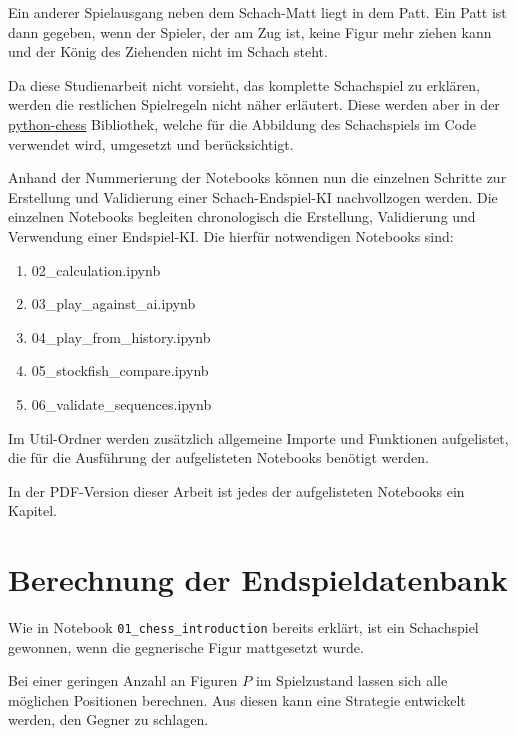 \documentclass[a4paper,12pt]{article}
\providecommand{\tightlist}{%
      \setlength{\itemsep}{0pt}\setlength{\parskip}{0pt}}
\begin{document}
Ein anderer Spielausgang neben dem Schach-Matt liegt in dem Patt. Ein
Patt ist dann gegeben, wenn der Spieler, der am Zug ist, keine Figur
mehr ziehen kann und der König des Ziehenden nicht im Schach steht.

    Da diese Studienarbeit nicht vorsieht, das komplette Schachspiel zu
erklären, werden die restlichen Spielregeln nicht näher erläutert. Diese
werden aber in der
\href{https://python-chess.readthedocs.io/en/latest/}{python-chess}
Bibliothek, welche für die Abbildung des Schachspiels im Code verwendet
wird, umgesetzt und berücksichtigt.

    Anhand der Nummerierung der Notebooks können nun die einzelnen Schritte
zur Erstellung und Validierung einer Schach-Endspiel-KI nachvollzogen
werden. Die einzelnen Notebooks begleiten chronologisch die Erstellung,
Validierung und Verwendung einer Endspiel-KI. Die hierfür notwendigen
Notebooks sind:

\begin{enumerate}
\def\labelenumi{\arabic{enumi}.}
\tightlist
\item
  02\_calculation.ipynb
\item
  03\_play\_against\_ai.ipynb
\item
  04\_play\_from\_history.ipynb
\item
  05\_stockfish\_compare.ipynb
\item
  06\_validate\_sequences.ipynb
\end{enumerate}

Im Util-Ordner werden zusätzlich allgemeine Importe und Funktionen
aufgelistet, die für die Ausführung der aufgelisteten Notebooks benötigt
werden.

In der PDF-Version dieser Arbeit ist jedes der aufgelisteten Notebooks
ein Kapitel.

    \hypertarget{berechnung-der-endspieldatenbank}{%
\section{Berechnung der
Endspieldatenbank}\label{berechnung-der-endspieldatenbank}}

Wie in Notebook \texttt{01\_chess\_introduction} bereits erklärt, ist
ein Schachspiel gewonnen, wenn die gegnerische Figur mattgesetzt wurde.

Bei einer geringen Anzahl an Figuren \(P\) im Spielzustand lassen sich
alle möglichen Positionen berechnen. Aus diesen kann eine Strategie
entwickelt werden, den Gegner zu schlagen.
\end{document}
